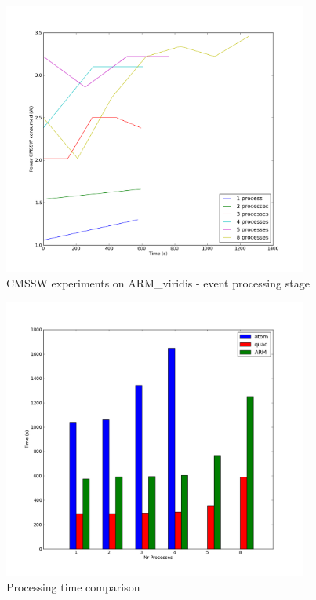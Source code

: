 \begin{figure}[h!]
  \centering
    \includegraphics[width=100mm]{"img/aalto/aalto_armEvents"}
    \caption{CMSSW experiments on ARM\_viridis - event processing stage}
    \label{fig:aalto_arm_events}
\end{figure}



\begin{figure}[h!]
  \centering
    \includegraphics[width=100mm]{"img/aalto/aalto_all_time"}
    \caption{Processing time comparison}
    \label{fig:aalto_time}
\end{figure}

